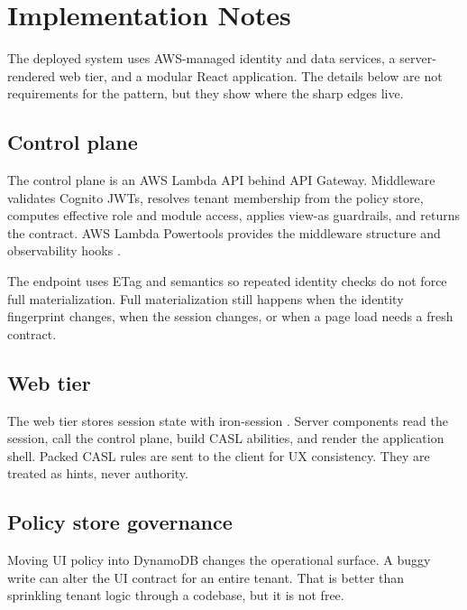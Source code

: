 \section{Implementation Notes}
\label{sec:implementation}

The deployed system uses AWS-managed identity and data services, a server-rendered web tier, and a modular React application. The details below are not requirements for the pattern, but they show where the sharp edges live.

\subsection{Control plane}
\label{sec:control_plane}

The control plane is an AWS Lambda API behind API Gateway. Middleware validates Cognito JWTs, resolves tenant membership from the policy store, computes effective role and module access, applies view-as guardrails, and returns the  contract. AWS Lambda Powertools provides the middleware structure and observability hooks \cite{aws_powertools}.

The endpoint uses ETag and  semantics so repeated identity checks do not force full materialization. Full materialization still happens when the identity fingerprint changes, when the session changes, or when a page load needs a fresh contract.

\subsection{Web tier}
\label{sec:web_tier}

The web tier stores session state with iron-session \cite{iron_session}. Server components read the session, call the control plane, build CASL abilities, and render the application shell. Packed CASL rules are sent to the client for UX consistency. They are treated as hints, never authority.

\subsection{Policy store governance}
\label{sec:policy_store_governance}

Moving UI policy into DynamoDB changes the operational surface. A buggy write can alter the UI contract for an entire tenant. That is better than sprinkling tenant logic through a codebase, but it is not free.

